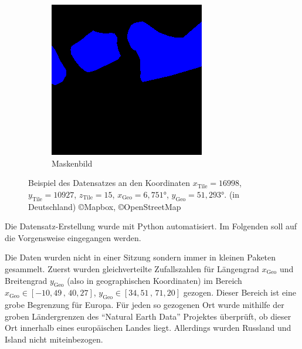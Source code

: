 \begin{figure}
\begin{subfigure}{0.3\textwidth}
        \includegraphics[width=\textwidth]{images/datensatz_beispiel_maske.png}
        \caption{Maskenbild}
        \label{fig:datensatz_beispiel_maske.png}
    \end{subfigure}
    \caption{Beispiel des Datensatzes an den Koordinaten %
            $x_\text{Tile} = 16998$, $y_\text{Tile} = 10927$, $z_\text{Tile} = 15$, %
            $x_\text{Geo} = 6,751°$, $y_\text{Geo} = 51,293°$. %
            (in Deutschland) \copyright Mapbox, \copyright OpenStreetMap}
    \label{fig:datensatz_beispiel}
\end{figure}

Die Datensatz-Erstellung wurde mit Python automatisiert.
Im Folgenden soll auf die Vorgensweise eingegangen werden.

Die Daten wurden nicht in einer Sitzung sondern immer in kleinen Paketen gesammelt.
Zuerst wurden gleichverteilte Zufallszahlen für Längengrad $x_\text{Geo}$ und Breitengrad $y_\text{Geo}$ (also in geographischen Koordinaten) 
im Bereich $x_\text{Geo} \in [-10,49 \,,\, 40,27]$, $y_\text{Geo} \in [34,51 \,,\, 71,20]$ gezogen.
Dieser Bereich ist eine grobe Begrenzung für Europa.
Für jeden so gezogenen Ort wurde mithilfe der groben Ländergrenzen des \enquote{Natural Earth Data} Projektes überprüft, 
ob dieser Ort innerhalb eines europäischen Landes liegt. \cite{natural_earth_countries}
Allerdings wurden Russland und Island nicht miteinbezogen.

